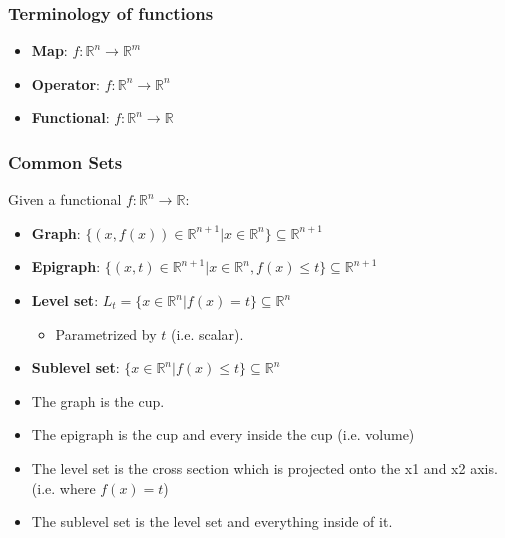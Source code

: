 \subsubsection{Terminology of functions}
\begin{definition}
    \begin{itemize}
        \item \textbf{Map}: $f: \mathbb{R}^n \to \mathbb{R}^m$
        \item \textbf{Operator}: $f: \mathbb{R}^n \to \mathbb{R}^n$
        \item \textbf{Functional}: $f: \mathbb{R}^n \to \mathbb{R}$
    \end{itemize}
\end{definition}

\subsubsection{Common Sets}
\begin{definition}
    Given a functional $f: \mathbb{R}^n \to \mathbb{R}$:
    \begin{itemize}
        \item \textbf{Graph}: $\{ (x, f(x)) \in \mathbb{R}^{n+1} | x \in \mathbb{R}^n \} \subseteq \mathbb{R}^{n+1}$ 
        \item \textbf{Epigraph}: $\{ (x, t) \in \mathbb{R}^{n+1} | x \in \mathbb{R}^n, f(x) \leq t \} \subseteq \mathbb{R}^{n+1} $
        \item \textbf{Level set}: $L_t = \{ x \in \mathbb{R}^n | f(x) = t \} \subseteq \mathbb{R}^n$
        \begin{itemize}
            \item Parametrized by $t$ (i.e. scalar).
        \end{itemize}
        \item \textbf{Sublevel set}: $\{ x \in \mathbb{R}^n | f(x) \leq t \} \subseteq \mathbb{R}^n$
    \end{itemize}
\end{definition}

\begin{example}
    \begin{itemize}
        \item The graph is the cup. 
        \item The epigraph is the cup and every inside the cup (i.e. volume)
        \item The level set is the cross section which is projected onto the x1 and x2 axis. (i.e. where $f(x)=t$) 
        \item The sublevel set is the level set and everything inside of it. 
    \end{itemize}
\end{example}

